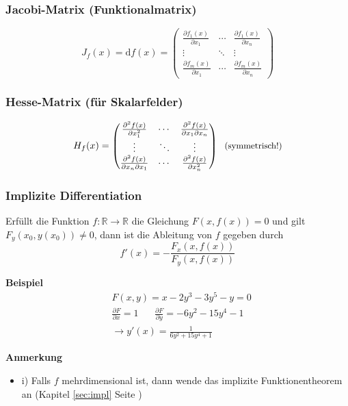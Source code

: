 \documentclass[8pt, a4paper, landscape, fleqn]{scrartcl}
\newenvironment {example}
				{\begin{itshape} \begin{small}}
				{\end{small} \end{itshape}}
\newenvironment {annotation}[1]
				{\begin{itshape} \begin{small} \textbf{#1} \begin{itemize}}
				{\end{itemize} \end{small} \end{itshape}}
\def\d{\text{d}}
\begin{document}
\begin{multicols*}{3}
				\subsubsection{Jacobi-Matrix (Funktionalmatrix)}
					\begin{equation*}
						J_f(x) = \d f (x) = 
						\begin{pmatrix}
							\frac{\partial f_1(x)}{\partial x_1} &\cdots &\frac{\partial f_1(x)}{\partial x_n}\\
							\vdots &\ddots &\vdots\\
							\frac{\partial f_m(x)}{\partial x_1 } &\cdots &\frac{\partial f_m(x)}{\partial x_n}
						\end{pmatrix}
					\end{equation*}
				\subsubsection{Hesse-Matrix (für Skalarfelder)} 
					\begin{equation*}
						H_f(x)=
						\begin{pmatrix}
							\frac{\partial^2f(x)}{\partial x_1^2} &\cdots &\frac{\partial^2f(x)}{\partial x_1 \partial x_n}\\
							\vdots &\ddots &\vdots\\
							\frac{\partial^2f(x)}{\partial x_n \partial x_1} &\cdots &\frac{\partial^2f(x)}{\partial x_n^2}
						\end{pmatrix} \hspace{6pt}  \text{\small(symmetrisch!)}
					\end{equation*}
				\subsubsection{Implizite Differentiation}
					Erfüllt die Funktion $f:\mathbb{R} \rightarrow \mathbb{R}$ die Gleichung $F(x, f(x))=0$ und gilt $F_y(x_0, y(x_0)) \ne 0$, dann ist die Ableitung von $f$ gegeben durch
					\[f'(x)=-\frac{F_x(x, f(x))}{F_y(x, f(x))}\]
					\begin{example}
						\textbf{Beispiel}
						\begin{align*}
							&F(x, y)=x-2y^3-3y^5-y=0\\
							&\frac{\partial F}{\partial x}=1 \hspace{20pt} \frac{\partial F}{\partial y}=-6y^2-15y^4-1\\
							&\rightarrow y'(x)=\frac{1}{6y^2+15y^4+1}
						\end{align*}
					\end{example}
					\begin{annotation}{Anmerkung}
						\item[i)] Falls $f$ mehrdimensional ist, dann wende das implizite Funktionentheorem an (Kapitel \ref{sec:impl} Seite \pageref{sec:impl}) 
					\end{annotation}

\end{multicols*}
\end{document}
